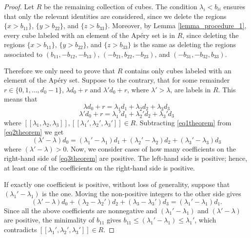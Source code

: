 \documentclass[12pt]{article}
\theoremstyle{remark}
\begin{document}
\begin{proof}
Let $R$ be the remaining collection of cubes.
The condition $\lambda_i < b_{ii}$ ensures that only the relevant identities are considered, since we delete the regions $\{x > b_{11}\}$, $\{y > b_{22}\}$, and $\{z > b_{33}\}$. Moreover, by Lemma \ref{lemma_procedure_1}, every cube labeled with an element of the Ap{\'e}ry set is in $R$, since deleting the regions $\{x > b_{11}\}$, $\{y > b_{22}\}$, and $\{z > b_{33}\}$ is the same as deleting the regions associated to $(b_{11}, - b_{12},-b_{13})$, $(-b_{21},b_{22},-b_{23})$, and $(-b_{31},-b_{32},b_{33})$. 

Therefore we only need to prove that $R$ contains only cubes labeled with an element of the Ap{\'e}ry set. Suppose to the contrary, that for some remainder $r \in \{0,1,\dots,d_0-1\}$, $\lambda d_0 + r$ and $\lambda' d_0 + r$, where $\lambda' > \lambda$, are labels in $R$. This means that
    \begin{equation}\label{eq1theorem}
        \lambda d_0 + r = \lambda_1d_1 + \lambda_2d_2 + \lambda_3d_3
    \end{equation}
     \begin{equation}\label{eq2theorem}
        \lambda' d_0 + r = \lambda_1'd_1 + \lambda_2'd_2 + \lambda_3'd_3
    \end{equation}
    where $[[\lambda_1,\lambda_2,\lambda_3]], [[\lambda_1',\lambda_2',\lambda_3']] \in R$.
    Subtracting \eqref{eq1theorem} from \eqref{eq2theorem} we get
    \begin{equation}\label{eq3theorem}
        (\lambda' - \lambda)d_0 = (\lambda_1' - \lambda_1)d_1 + (\lambda_2' - \lambda_2)d_2 + (\lambda_3' - \lambda_3)d_3
    \end{equation}
    where $(\lambda' - \lambda)>0$. Now, we consider cases of how many coefficients on the right-hand side of \eqref{eq3theorem} are positive. The left-hand side is positive; hence, at least one of the coefficients on the right-hand side is positive. 
    
If exactly one coefficient is positive, without loss of generality, suppose that $(\lambda_1' - \lambda_1)$ is the one. Moving the non-positive integers to the other side gives
    \begin{equation}\label{eq4theorem}
        (\lambda' - \lambda)d_0  + (\lambda_2 - \lambda_2')d_2 + (\lambda_3 - \lambda_3')d_3= (\lambda_1' - \lambda_1)d_1.
    \end{equation} 
Since all the above coefficients are nonnegative and $(\lambda_1' - \lambda_1)$ and $(\lambda' - \lambda) $ are positive, the minimality of $b_{11}$ gives $b_{11} \leq (\lambda_1' - \lambda_1) \leq \lambda_1'$, which contradicts $[[\lambda_1',\lambda_2',\lambda_3']] \in R$.


\end{proof}
\end{document}
